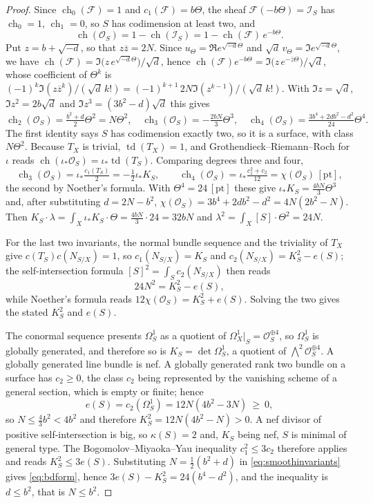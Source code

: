\documentclass[11pt,reqno]{amsart}
\theoremstyle{plain}
\theoremstyle{definition}
\theoremstyle{remark}
\newcommand{\cF}{\mathcal{F}}
\newcommand{\cO}{\mathcal{O}}
\newcommand{\cI}{\mathcal{I}}
\DeclareMathOperator{\ch}{ch}
\DeclareMathOperator{\td}{td}
\newcommand{\bbar}[1]{\overline{#1}}
\begin{document}
\begin{proof}
Since $\ch_{0}(\cF)=1$ and $c_{1}(\cF)=b\Theta$, the sheaf
$\cF(-b\Theta)=\cI_{S}$ has $\ch_{0}=1$, $\ch_{1}=0$, so $S$ has codimension
at least two, and
\[
  \ch(\cO_{S})=1-\ch(\cI_{S})=1-\ch(\cF)\,e^{-b\Theta}.
\]
Put $z=b+\sqrt{-d}$, so that $z\bbar z=2N$. Since
$u_{\Theta}=\Re e^{\sqrt{-d}\Theta}$ and
$\sqrt d\,v_{\Theta}=\Im e^{\sqrt{-d}\Theta}$, we have
$\ch(\cF)=\Im\bigl(z\,e^{\sqrt{-d}\Theta}\bigr)/\sqrt d$, hence
$\ch(\cF)e^{-b\Theta}=\Im\bigl(z\,e^{-\bbar z\Theta}\bigr)/\sqrt d$, whose
coefficient of $\Theta^{k}$ is
$(-1)^{k}\Im(z\bbar z^{k})/(\sqrt d\,k!)=(-1)^{k+1}\,2N\Im(z^{k-1})/(\sqrt d\,k!)$.
With $\Im z=\sqrt d$, $\Im z^{2}=2b\sqrt d$ and
$\Im z^{3}=(3b^{2}-d)\sqrt d$ this gives
\[
  \ch_{2}(\cO_{S})=\tfrac{b^{2}+d}{2}\Theta^{2}=N\Theta^{2},\quad
  \ch_{3}(\cO_{S})=-\tfrac{2bN}{3}\Theta^{3},\quad
  \ch_{4}(\cO_{S})=\tfrac{3b^{4}+2db^{2}-d^{2}}{24}\Theta^{4}.
\]
The first
identity says $S$ has codimension exactly two, so it is a surface, with class
$N\Theta^{2}$. Because $T_{X}$ is trivial, $\td(T_{X})=1$, and
Grothendieck--Riemann--Roch for $\iota$ reads
$\ch(\iota_{*}\cO_{S})=\iota_{*}\td(T_{S})$. Comparing degrees three and four,
\[
  \ch_{3}(\cO_{S})=\iota_{*}\tfrac{c_{1}(T_{S})}{2}=-\tfrac12\iota_{*}K_{S},
  \qquad
  \ch_{4}(\cO_{S})=\iota_{*}\tfrac{c_{1}^{2}+c_{2}}{12}
  =\chi(\cO_{S})\,[\mathrm{pt}],
\]
the second by Noether's formula. With $\Theta^{4}=24\,[\mathrm{pt}]$ these give
$\iota_{*}K_{S}=\tfrac{4bN}{3}\Theta^{3}$ and, after substituting
$d=2N-b^{2}$, $\chi(\cO_{S})=3b^{4}+2db^{2}-d^{2}=4N(2b^{2}-N)$.
Then $K_{S}\cdot\lambda=\int_{X}\iota_{*}K_{S}\cdot\Theta=\tfrac{4bN}{3}\cdot24=32bN$
and $\lambda^{2}=\int_{X}[S]\cdot\Theta^{2}=24N$.

For the last two invariants, the normal bundle sequence and the triviality of
$T_{X}$ give $c(T_{S})c(N_{S/X})=1$, so $c_{1}(N_{S/X})=K_{S}$ and
$c_{2}(N_{S/X})=K_{S}^{2}-e(S)$; the self-intersection formula
$[S]^{2}=\int_{S}c_{2}(N_{S/X})$ then reads
\[
  24N^{2}=K_{S}^{2}-e(S),
\]
while Noether's formula reads $12\chi(\cO_{S})=K_{S}^{2}+e(S)$. Solving the
two gives the stated $K_{S}^{2}$ and $e(S)$.

The conormal sequence presents $\Omega^{1}_{S}$ as a quotient of
$\Omega^{1}_{X}|_{S}=\cO_{S}^{\oplus4}$, so $\Omega^{1}_{S}$ is globally
generated, and therefore so is $K_{S}=\det\Omega^{1}_{S}$, a quotient of
$\bigwedge^{2}\cO_{S}^{\oplus4}$. A globally generated line bundle is nef. A
globally generated rank two bundle on a surface has $c_{2}\ge0$, the class
$c_{2}$ being represented by the vanishing scheme of a general section, which
is empty or finite; hence
\[
  e(S)=c_{2}(\Omega^{1}_{S})=12N(4b^{2}-3N)\ \ge\ 0,
\]
so $N\le\tfrac43b^{2}<4b^{2}$ and therefore $K_{S}^{2}=12N(4b^{2}-N)>0$. A nef
divisor of positive self-intersection is big, so $\kappa(S)=2$ and, $K_{S}$
being nef, $S$ is minimal of general type. The Bogomolov--Miyaoka--Yau
inequality $c_{1}^{2}\le3c_{2}$ therefore applies and reads
$K_{S}^{2}\le3e(S)$. Substituting $N=\tfrac12(b^{2}+d)$ in
\eqref{eq:smoothinvariants} gives \eqref{eq:bdform}, hence
$3e(S)-K_{S}^{2}=24(b^{4}-d^{2})$, and the inequality is $d\le b^{2}$, that
is $N\le b^{2}$.


\end{proof}
\end{document}
